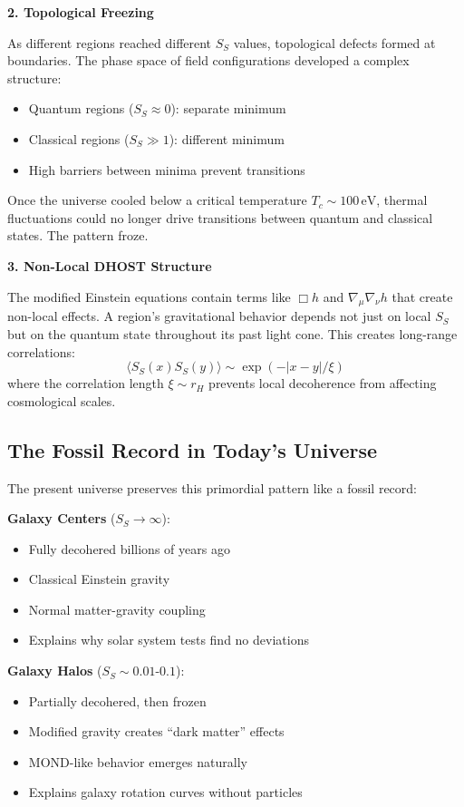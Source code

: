 \documentclass[12pt]{article}
\begin{document}
\textbf{2. Topological Freezing}

As different regions reached different $S_S$ values, topological defects formed at boundaries. The phase space of field configurations developed a complex structure:
\begin{itemize}
    \item Quantum regions ($S_S \approx 0$): separate minimum
    \item Classical regions ($S_S \gg 1$): different minimum
    \item High barriers between minima prevent transitions
\end{itemize}
Once the universe cooled below a critical temperature $T_c \sim 100\,\mathrm{eV}$, thermal fluctuations could no longer drive transitions between quantum and classical states. The pattern froze.

\textbf{3. Non-Local DHOST Structure}

The modified Einstein equations contain terms like $\Box h$ and $\nabla_\mu\nabla_\nu h$ that create non-local effects. A region's gravitational behavior depends not just on local $S_S$ but on the quantum state throughout its past light cone. This creates long-range correlations:
\begin{equation}
    \langle S_S(x) S_S(y) \rangle \sim \exp(-|x-y|/\xi)
\end{equation}
where the correlation length $\xi \sim r_H$ prevents local decoherence from affecting cosmological scales.

\subsection{The Fossil Record in Today's Universe}

The present universe preserves this primordial pattern like a fossil record:

\textbf{Galaxy Centers} ($S_S \rightarrow \infty$):
\begin{itemize}
    \item Fully decohered billions of years ago
    \item Classical Einstein gravity
    \item Normal matter-gravity coupling
    \item Explains why solar system tests find no deviations
\end{itemize}

\textbf{Galaxy Halos} ($S_S \sim 0.01$-$0.1$):
\begin{itemize}
    \item Partially decohered, then frozen
    \item Modified gravity creates ``dark matter'' effects
    \item MOND-like behavior emerges naturally
    \item Explains galaxy rotation curves without particles
\end{itemize}
\end{document}
